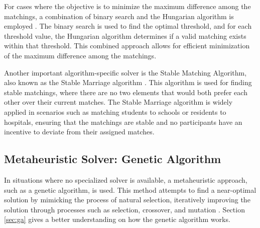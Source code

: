         For cases where the objective is to minimize the maximum difference among the matchings, a combination of binary search and the Hungarian algorithm is employed \cite{land1974automatic}. The binary search is used to find the optimal threshold, and for each threshold value, the Hungarian algorithm determines if a valid matching exists within that threshold. This combined approach allows for efficient minimization of the maximum difference among the matchings.

        Another important algorithm-specific solver is the Stable Matching Algorithm, also known as the Stable Marriage algorithm \cite{gale1962college}. This algorithm is used for finding stable matchings, where there are no two elements that would both prefer each other over their current matches. The Stable Marriage algorithm is widely applied in scenarios such as matching students to schools or residents to hospitals, ensuring that the matchings are stable and no participants have an incentive to deviate from their assigned matches.
            
       \subsection{Metaheuristic Solver: Genetic Algorithm}
            In situations where no specialized solver is available, a metaheuristic approach, such as a genetic algorithm, is used. This method attempts to find a near-optimal solution by mimicking the process of natural selection, iteratively improving the solution through processes such as selection, crossover, and mutation \cite{holland1992adaptation}. Section \ref{sec:ga} gives a better understanding on how the genetic algorithm works.

